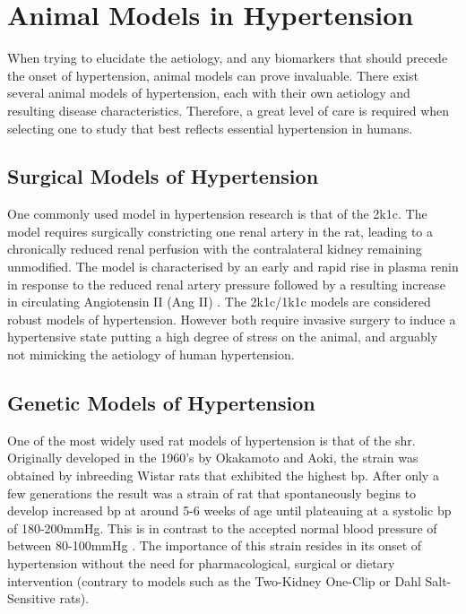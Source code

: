 \section{Animal Models in Hypertension}

When trying to elucidate the aetiology, and any biomarkers that should precede the onset of hypertension, animal models can prove invaluable. There exist several animal models of hypertension, each with their own aetiology and resulting disease characteristics. Therefore, a great level of care is required when selecting one to study that best reflects essential hypertension in humans. 

\subsection{Surgical Models of Hypertension}

One commonly used model in hypertension research is that of the \acrfull{2k1c}. The model requires surgically constricting one renal artery in the rat, leading to a chronically reduced renal perfusion with the contralateral kidney remaining unmodified. The model is characterised by an early and rapid rise in plasma renin in response to the reduced renal artery pressure followed by a resulting increase in circulating Angiotensin II (Ang II) \cite{Wiesel1997}. The \acrshort{2k1c}/\acrshort{1k1c} models are considered robust models of hypertension. However both require invasive surgery to induce a hypertensive state putting a high degree of stress on the animal, and arguably not mimicking the aetiology of human hypertension.

\subsection{Genetic Models of Hypertension}

One of the most widely used rat models of hypertension is that of the \acrfull{shr}. Originally developed in the 1960’s by Okakamoto and Aoki, the strain was obtained by inbreeding Wistar rats that exhibited the highest \acrshort{bp}. After only a few generations the result was a strain of rat that spontaneously begins to develop increased \acrshort{bp} at around 5-6 weeks of age until plateauing at a systolic \acrshort{bp} of 180-200mmHg. This is in contrast to the accepted normal blood pressure of between 80-100mmHg \cite{Okamoto1963}. The importance of this strain resides in its onset of hypertension without the need for pharmacological, surgical or dietary intervention (contrary to models such as the Two-Kidney One-Clip or Dahl Salt-Sensitive rats). 

